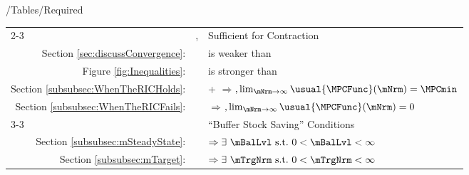 \documentclass[\econtexRoot/BufferStockTheory]{subfiles}
\providecommand{\TblName}{}
\renewcommand{\TblName}{Required}
\begin{document}
\begin{verbatimwrite}{\econtexRoot/Tables/\TblName}
\begin{table}
{\begin{tabular}{|l|l|l|}
        \\ \cline{2-3}\multicolumn{1}{|r|}{Section \ref{subsec:contraction}:}                            & \FVAC, \WRIC                      & Sufficient for Contraction
        \\ \multicolumn{1}{|r|}{Section \ref{sec:discussConvergence}:}                               &                      & {\WRIC}{ is} weaker than \RIC 
        \\  \multicolumn{1}{|r|}{Figure \ref{fig:Inequalities}:}                                        &                                 & {\FVAC}{ is} stronger than \PFFVAC 
        \\ \multicolumn{1}{|r|}{Section \ref{subsubsec:WhenTheRICHolds}:}
                                                                                                                               &                                 & \cncl{\FHWC}+{\RIC} $\Rightarrow ${\GICRaw}$, \lim_{\mNrm \rightarrow \infty} \usual{\MPCFunc}(\mNrm)=\MPCmin$
        \\  \multicolumn{1}{|r|}{Section \ref{subsubsec:WhenTheRICFails}:}                                        &                                 & \cncl{\RIC}  $\Rightarrow $\cncl{\FHWC}$, \lim_{\mNrm \rightarrow \infty} \usual{\MPCFunc}(\mNrm)=0$
        \\ \cline{3-3}\multicolumn{1}{|r|}{Section \ref{subsec:onetarget}:}                                        &                                 & ``Buffer Stock Saving'' Conditions
        \\ \multicolumn{1}{|r|}{Section \ref{subsubsec:mSteadyState}:}                                        &                                 & \phantom{-Nrm}{\GICRaw} $\Rightarrow  \exists\phantom{~}\mBalLvl \phantom{~}\text{s.t.}\phantom{~} 0 < \mBalLvl < \infty$ %
        \\ \multicolumn{1}{|r|}{Section \ref{subsubsec:mTarget}:}                                        &                                 & {\GICMod} $\Rightarrow \exists \phantom{~} \mTrgNrm \phantom{~} \text{s.t.}\phantom{~} 0 < \mTrgNrm < \infty$ %
                                                                                                                           

\end{tabular}}
\end{table}
\end{verbatimwrite}
\end{document}
